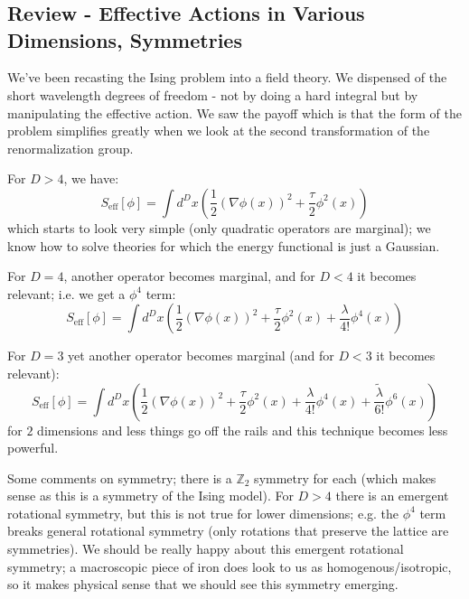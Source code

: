 \section{}

\subsection{Review - Effective Actions in Various Dimensions, Symmetries}
We've been recasting the Ising problem into a field theory. We dispensed of the short wavelength degrees of freedom - not by doing a hard integral but by manipulating the effective action. We saw the payoff which is that the form of the problem simplifies greatly when we look at the second transformation of the renormalization group.

For $D > 4$, we have:
\begin{equation}
    S_{\text{eff}}[\phi] = \int d^Dx \left(\frac{1}{2}(\nabla \phi(x))^2 + \frac{\tau}{2}\phi^2(x)\right)
\end{equation}
which starts to look very simple (only quadratic operators are marginal); we know how to solve theories for which the energy functional is just a Gaussian.

For $D = 4$, another operator becomes marginal, and for $D < 4$ it becomes relevant; i.e. we get a $\phi^4$ term:
\begin{equation}
    S_{\text{eff}}[\phi] = \int d^Dx \left(\frac{1}{2}(\nabla \phi(x))^2 + \frac{\tau}{2}\phi^2(x) + \frac{\lambda}{4!}\phi^4(x)\right)
\end{equation}

For $D = 3$ yet another operator becomes marginal (and for $D < 3$ it becomes relevant):
\begin{equation}
    S_{\text{eff}}[\phi] = \int d^D x\left(\frac{1}{2}(\nabla \phi(x))^2 + \frac{\tau}{2}\phi^2(x) + \frac{\lambda}{4!}\phi^4(x) + \frac{\tilde{\lambda}}{6!}\phi^6(x)\right)
\end{equation}
for $2$ dimensions and less things go off the rails and this technique becomes less powerful.

Some comments on symmetry; there is a $\mathbb{Z}_2$ symmetry for each (which makes sense as this is a symmetry of the Ising model). For $D > 4$ there is an emergent rotational symmetry, but this is not true for lower dimensions; e.g. the $\phi^4$ term breaks general rotational symmetry (only rotations that preserve the lattice are symmetries). We should be really happy about this emergent rotational symmetry; a macroscopic piece of iron does look to us as homogenous/isotropic, so it makes physical sense that we should see this symmetry emerging.

